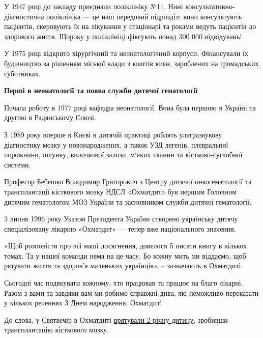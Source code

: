 У 1947 році до закладу приєднали поліклініку №11. Нині
консультативно-діагностична поліклініка — це наш передовий підрозділ: вони
консультують пацієнтів, скеровують їх на лікування у стаціонарі та роками
ведуть пацієнтів до здорового життя. Щороку у поліклініці фіксують понад 300
000 відвідувань!


У 1975 році відкрито хірургічний та неонатологічний корпуси. Фінансували їх
будівництво за рішенням міської влади з коштів киян, зароблених на громадських
суботниках.
 
\textbf{Перші в неонатології та поява служби дитячої гематології}
 
Почала роботу в 1977 році кафедра неонатології. Вона була першою в Україні та
другою в Радянському Союзі.
 
З 1989 року вперше в Києві в дитячій практиці роблять ультразвукову діагностику
мозку у новонароджених, а також УЗД легенів, плевральної порожнини, шлунку,
вилочкової залози, м‘яких тканин та кістково-суглобної системи.


Професор Бебешко Володимир Григорович з Центру дитячої онкогематології та
трансплантації кісткового мозку НДСЛ «Охматдит» був першим Головним дитячим
гематологом МОЗ України та засновником служби дитячої гематології.
 
3 липня 1996 року Указом Президента України створено українську дитячу
спеціалізовану лікарню «Охматдит» — тепер вже національного значення.


«Щоб розповісти про всі наші досягнення, довелося б писати книгу в кількох
томах. Та у нашої команди нема на це часу. Бо кожну мить ми віддаємо, щоб
рятувати життя та здоров’я маленьких українців», – зазначають в  Охматдиті.
 
Сьогодні час подякувати кожному, хто працював та працює на благо лікарні. Разом
з вами та завдяки вам ми робимо справжні дива, які неможливо переказати у
кількох реченнях  З Днем народження, Охматдит!
 
До слова, у Святвечір в Охматдиті \href{https://bigkyiv.com.ua/u-svyatvechir-v-ohmatdyti-vryatuvaly-2-richnu-dytynu-zrobyvshy-transplantacziyu-kistkovogo-mozku}{врятували 2-річну дитину}, зробивши
трансплантацію кісткового мозку.
